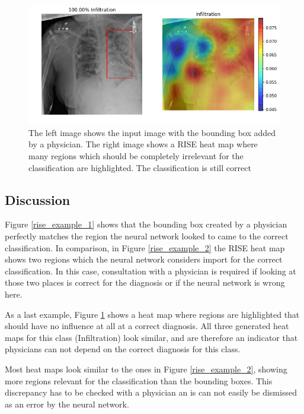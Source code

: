 \begin{figure}[H]
\centering
\includegraphics[width=12cm]{chapters/03_classification/images/rise_8.png}
\caption{The left image shows the input image with the bounding box added by a physician. The right image shows a RISE heat map where many regions which should be completely irrelevant for the classification are highlighted. The classification is still correct}
\label{rise_example_3}
\end{figure}

\subsection{Discussion}
Figure \ref{rise_example_1} shows that the bounding box created by a physician perfectly matches the region the neural network looked to came to the correct classification. In comparison, in Figure \ref{rise_example_2} the RISE heat map shows two regions which the neural network considers import for the correct classification. In this case, consultation with a physician is required if looking at those two places is correct for the diagnosis or if the neural network is wrong here.

As a last example, Figure \ref{rise_example_3} shows a heat map where regions are highlighted that should have no influence at all at a correct diagnosis. All three generated heat maps for this class (Infiltration) look similar, and are therefore an indicator that physicians can not depend on the correct diagnosis for this class.

Most heat maps look similar to the ones in Figure \ref{rise_example_2}, showing more regions relevant for the classification than the bounding boxes. This discrepancy has to be checked with a physician an is can not easily be dismissed as an error by the neural network.
